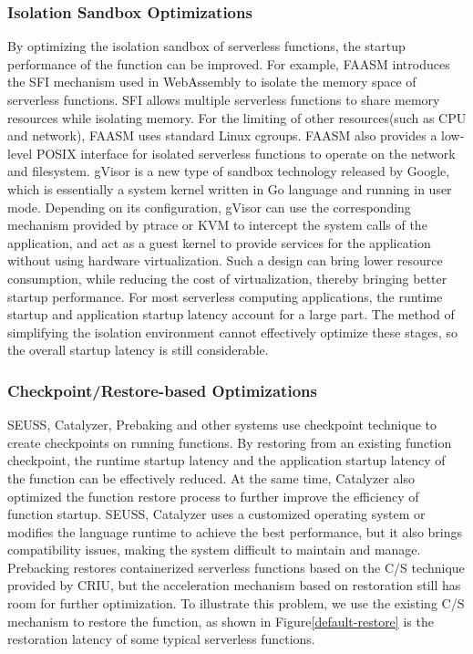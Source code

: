 \subsubsection{Isolation Sandbox Optimizations}
By optimizing the isolation sandbox of serverless functions, 
the startup performance of the function can be improved. 
For example, 
FAASM\cite{faasm} introduces the SFI mechanism used in WebAssembly to isolate the memory space of serverless functions. 
SFI allows multiple serverless functions to share memory resources while isolating memory. 
For the limiting of other resources(such as CPU and network), FAASM uses standard Linux cgroups. 
FAASM also provides a low-level POSIX interface for isolated serverless functions to operate on the network and filesystem.
gVisor\cite{gvisor} is a new type of sandbox technology released by Google, 
which is essentially a system kernel written in Go language and running in user mode. 
Depending on its configuration, 
gVisor can use the corresponding mechanism provided by ptrace or KVM to intercept the system calls of the application, 
and act as a guest kernel to provide services for the application without using hardware virtualization. 
Such a design can bring lower resource consumption, 
while reducing the cost of virtualization, 
thereby bringing better startup performance.
For most serverless computing applications, 
the runtime startup and application startup latency account for a large part. The method of simplifying the isolation environment cannot effectively optimize these stages, 
so the overall startup latency is still considerable.

\subsubsection{Checkpoint/Restore-based Optimizations}
SEUSS\cite{seuss}, Catalyz\-er\cite{catalyzer}, Prebaking\cite{prebaking} and other systems use checkpoint technique to create checkpoints on running functions. 
By restoring from an existing function checkpoint, 
the runtime startup latency and the application startup latency of the function can be effectively reduced. 
At the same time, 
Catalyzer also optimized the function restore process to further improve the efficiency of function startup.
SEUSS, Catalyzer uses a customized operating system 
or modifies the language runtime to achieve the best performance, 
but it also brings compatibility issues, 
making the system difficult to maintain and manage. 
Prebacking restores containerized serverless functions based on the C/S technique provided by CRIU, 
but the acceleration mechanism based on restoration still has room for further optimization. 
To illustrate this problem, 
we use the existing C/S mechanism to restore the function, 
as shown in Figure\ref{default-restore} is the restoration latency of some typical serverless functions.

